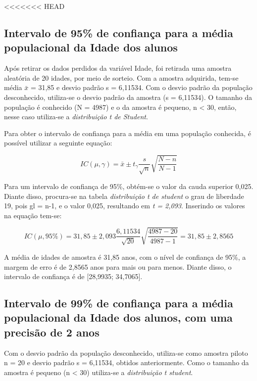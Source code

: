 <<<<<<< HEAD
\subsection{Intervalo de 95\% de confiança para a média populacional da Idade dos alunos}
\label{sub:1a}
Após retirar os dados perdidos da variável Idade, foi retirada uma amostra aleatória de 20 idades, por meio de sorteio. Com a amostra adquirida, tem-se média $\bar{x}$ = 31,85 e desvio padrão s 
= 6,11534. Com o desvio padrão da população desconhecido, utiliza-se o desvio padrão da amostra (s = 6,11534). O tamanho da população é conhecido (N = 4987) e o da amostra é pequeno, n < 30, então, 
nesse caso utiliza-se a \textit{distribuição t de Student}.

Para obter o intervalo de confiança para a média em uma população conhecida, é possível utilizar a seguinte equação:

\begin{equation*}
 IC (\mu, \gamma) = \bar{x} \pm t_\gamma \frac{s}{\sqrt{n}} \sqrt{\frac{N-n}{N-1}}
\end{equation*}

Para um intervalo de confiança de 95\%, obtém-se o valor da cauda superior 0,025. Diante disso, procura-se na tabela \textit{distribuição t de student} o grau de liberdade 19, pois gl = n-1, e o 
valor 0,025, resultando em \textit{t = 2,093}. Inserindo os valores na equação tem-se:

\begin{equation*}
 IC (\mu, 95\%) = 31,85 \pm 2,093 \frac{6,11534}{\sqrt{20}} \sqrt{\frac{4987 - 20}{4987 - 1}} 
                = 31,85 \pm 2,8565
\end{equation*}

A média de idades de amostra é 31,85 anos, com o nível de confiança de 95\%, a margem de erro é de 2,8565 anos para mais ou para menos. Diante disso, o intervalo de confiança é de [28,9935; 34,7065].

\subsection{Intervalo de 99\% de confiança para a média populacional da Idade dos alunos, com uma precisão de 2 anos}

Com o desvio padrão da população desconhecido, utiliza-se como amostra piloto n = 20 e desvio padrão s = 6,11534, obtidos anteriormente. Como o tamanho da amostra é pequeno (n < 30) utiliza-se a 
\textit{distribuição t student}.

